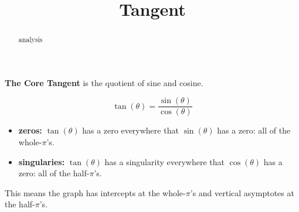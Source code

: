 \documentclass{ximera}
\title{Tangent}
\begin{document}
\begin{abstract}
analysis
\end{abstract}
\maketitle











\textbf{The Core Tangent} is the quotient of sine and cosine.

\[   \tan(\theta)  =  \frac{\sin(\theta)}{\cos(\theta)}  \]


\begin{itemize}
\item \textbf{zeros:} $\tan(\theta)$ has a zero everywhere that $\sin(\theta)$ has a zero:  all of the whole-$\pi$'s.
\item \textbf{singularies:} $\tan(\theta)$ has a singularity everywhere that $\cos(\theta)$ has a zero:  all of the half-$\pi$'s.
\end{itemize}

This means the graph has intercepts at the whole-$\pi$'s and vertical asymptotes at the half-$\pi$'s.
\end{document}
